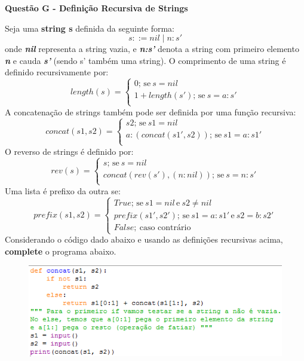 \documentclass[a4paper, 12pt]{article}
\begin{document}
\newpage %
\begin{center}
\textbf{{\Large Questão G - Definição Recursiva de Strings}}
\end{center}
\vspace{5pt}
Seja uma \textbf{string s} definida da seguinte forma: $$s::= nil \mid n:s' $$onde \textbf{\textit{nil}} representa a string vazia, e \textbf{\textit{n:s'}} denota a string com primeiro elemento \textbf{\textit{n}} e cauda \textbf{\textit{s'}} (sendo s' também uma string). \newline 
O comprimento de uma string é definido recursivamente por:
$$length(s) =
		\begin{cases}
			0;\, \textrm{se}\ s = nil \\
			1 + length(s');\, \textrm{se}\ s = a:s' \\
		\end{cases}
$$
A concatenação de strings também pode ser definida por uma função recursiva:
$$concat(s1,s2) =
		\begin{cases}
			s2;\, \textrm{se}\ s1 = nil \\
			a:(concat(s1',s2));\, \textrm{se}\ s1 = a:s1' \\
		\end{cases}
$$
O reverso de strings é definido por:
$$rev(s) =
		\begin{cases}
			s;\, \textrm{se}\ s = nil \\
			concat(rev(s'), (n:nil));\, \textrm{se}\ s = n:s' \\
		\end{cases}
$$
Uma lista é prefixo da outra se:
$$prefix(s1,s2) =
		\begin{cases}
			True;\, \textrm{se}\ s1 = nil\, \textrm{e}\  s2 \neq nil\\
			prefix(s1', s2');\, \textrm{se}\ s1 = a:s1'\, \textrm{e}\ s2 = b:s2' \\
			False;\ \textrm{caso contrário}
		\end{cases}
$$
Considerando o código dado abaixo e usando as definições recursivas acima, \textbf{complete} o programa abaixo.
\begin{figure}[H]
	\centering
	\includegraphics[scale=0.8]{strings.png}
\end{figure}
\end{document}
